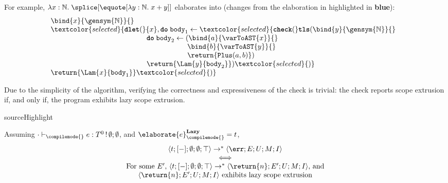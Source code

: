 For example, $\lambda x:\mathbb{N}. \; \splice[{\equote[\lambda{y}: \mathbb{N}. \; x+y]}]$ elaborates into (changes from the elaboration in  highlighted in \textbf{\textcolor{selected}{blue}}):
{
\[\begin{array}{@{}l}
  \bind{x}{\gensym{\mathbb{N}}}{} \\
  \textcolor{selected}{\textbf{\texttt{dlet}}(}{x}, \textbf{\texttt{do}} \; {\texttt{body}_1} \leftarrow \textcolor{selected}{\textbf{\texttt{check}}(}\textbf{\texttt{tls}}({\bind{y}{\gensym{\mathbb{N}}}{}} \\
    \quad\quad\quad\quad\quad\quad\quad
    \quad\quad\quad\quad\quad\quad\,\,
    \textbf{\texttt{do}}\;{\texttt{body}_2} \leftarrow {(\bind{a}{\varToAST{x}}{}}\\
    \quad\quad\quad\quad\quad\quad\quad\quad
    \quad\quad\quad\quad\quad\quad\quad\quad
    \quad\quad\quad
    \bind{b}{\varToAST{y}}{}\\
    \quad\quad\quad\quad\quad\quad\quad\quad
    \quad\quad\quad\quad\quad\quad\quad\quad
    \quad\quad\quad
    \return{\texttt{Plus}(a, b)})\\
    \quad\quad\quad\quad\quad\quad\quad
    \quad\quad\quad\quad\quad\quad\,\,
    \return{\Lam{y}{\texttt{body}_2}})\textcolor{selected}{)}\\
  {\return{\Lam{x}{\texttt{body}_1}}}\textcolor{selected}{)}
\end{array}\]
}

Due to the simplicity of the algorithm, verifying the correctness and expressiveness of the check is trivial: the check reports scope extrusion if, and only if, the program exhibits lazy scope extrusion.

\begin{theorem}{sourceHighlight}

Assuming $\cdot \vdash_{\compilemode{}} e: T^0 \, ! \, \emptyset;\emptyset$, and $\elaborate{e}_{\compilemode{}}^{\textbf{Lazy}} = t$, 
\[\begin{array}{c}
\langle t; [-]; \emptyset; \emptyset; \top \rangle \to^{*} \langle \err; E; U; M; I \rangle \\
\iff \\
\text{For some $E'$, }
\langle t; [-]; \emptyset; \emptyset; \top \rangle \to^{*} \langle \return{n}; E'; U; M; I \rangle\text{, and}\\
\langle \return{n}; E'; U; M; I \rangle \text{ exhibits lazy scope extrusion}
\end{array}
\]
\end{theorem}

